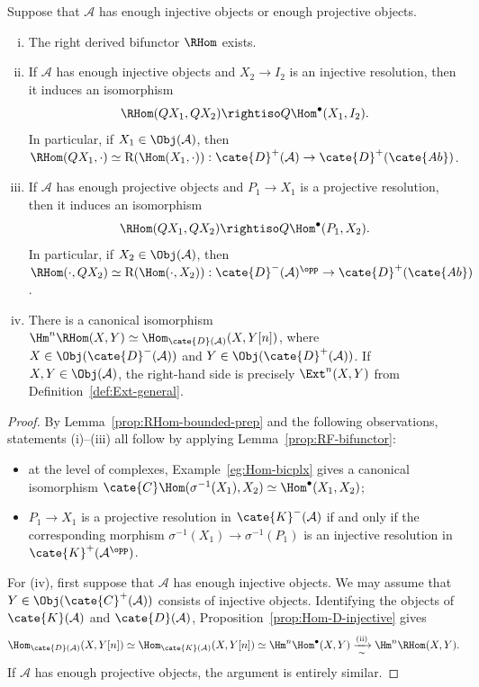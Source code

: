 \begin{theorem}\label{prop:RHom}\label{prop:RHom-bounded}
	Suppose that $\mathcal{A}$ has enough injective objects or enough
	projective objects.
	\begin{enumerate}[(i)]
		\item The right derived bifunctor $\RHom$ exists.
		\item If $\mathcal{A}$ has enough injective objects and $X_2\to I_2$ is
		an injective resolution, then it induces an isomorphism
		\[ \RHom(QX_1, QX_2) \rightiso Q \Hom^\bullet(X_1, I_2). \]
		In particular, if $X_1\in\Obj(\mathcal{A})$, then
		$\RHom(QX_1,\cdot)\simeq\mathrm{R}(\Hom(X_1,\cdot)):
		\cate{D}^+(\mathcal{A})\to\cate{D}^+(\cate{Ab})$.
		\item If $\mathcal{A}$ has enough projective objects and $P_1\to X_1$
		is a projective resolution, then it induces an isomorphism
		\[ \RHom(QX_1, QX_2) \rightiso Q \Hom^\bullet(P_1, X_2). \]
		In particular, if $X_2\in\Obj(\mathcal{A})$, then
		$\RHom(\cdot,QX_2)\simeq\mathrm{R}(\Hom(\cdot,X_2)):
		\cate{D}^-(\mathcal{A})^{\opp}\to\cate{D}^+(\cate{Ab})$.
		\item There is a canonical isomorphism
		$\Hm^n\RHom(X,Y)\simeq
		\Hom_{\cate{D}(\mathcal{A})}(X,Y[n])$, where
		$X\in\Obj(\cate{D}^-(\mathcal{A}))$ and
		$Y\in\Obj(\cate{D}^+(\mathcal{A}))$. If
		$X,Y\in\Obj(\mathcal{A})$, the right-hand side is precisely
		$\Ext^n(X,Y)$ from Definition~\ref{def:Ext-general}.
	\end{enumerate}
\end{theorem}
\begin{proof}
	By Lemma~\ref{prop:RHom-bounded-prep} and the following observations,
	statements (i)--(iii) all follow by applying
	Lemma~\ref{prop:RF-bifunctor}:
	\begin{itemize}
		\item at the level of complexes, Example~\ref{eg:Hom-bicplx} gives a
		canonical isomorphism
		$\cate{C}\Hom(\sigma^{-1}(X_1),X_2)\simeq\Hom^\bullet(X_1,X_2)$;
		\item $P_1\to X_1$ is a projective resolution in
		$\cate{K}^-(\mathcal{A})$ if and only if the corresponding morphism
		$\sigma^{-1}(X_1)\to\sigma^{-1}(P_1)$ is an injective resolution in
		$\cate{K}^+(\mathcal{A}^{\opp})$.
	\end{itemize}

	For (iv), first suppose that $\mathcal{A}$ has enough injective objects. We
	may assume that $Y\in\Obj(\cate{C}^+(\mathcal{A}))$ consists of injective
	objects. Identifying the objects of $\cate{K}(\mathcal{A})$ and
	$\cate{D}(\mathcal{A})$, Proposition~\ref{prop:Hom-D-injective} gives
	\[ \Hom_{\cate{D}(\mathcal{A})}(X, Y[n]) \simeq \Hom_{\cate{K}(\mathcal{A})}(X, Y[n]) \simeq \Hm^n \Hom^\bullet(X, Y) \xrightarrow[\sim]{\text{(ii)}} \Hm^n \RHom(X, Y). \]
	If $\mathcal{A}$ has enough projective objects, the argument is entirely
	similar.
\end{proof}

